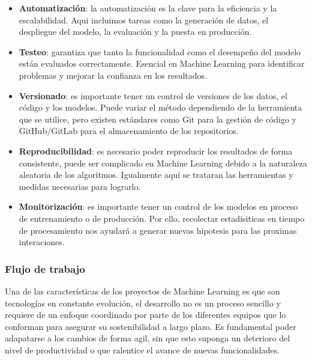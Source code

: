 \begin{itemize}
    \item \textbf{Automatización}: la automatización es la clave para la eficiencia y la escalabilidad.
          Aqui incluimos tareas como la generación de datos, el despliegue del modelo, la evaluación y
          la puesta en producción.
    \item \textbf{Testeo}: garantiza que tanto la funcionalidad como el desempeño del modelo están evaluados correctamente.
          Esencial en Machine Learning para identificar problemas y mejorar la confianza en los resultados.
    \item \textbf{Versionado}: es importante tener un control de versiones de los datos, el código y los modelos.
          Puede variar el método dependiendo de la herramienta que se utilice, pero existen estándares como Git para la gestión
          de código y GitHub/GitLab para el almacenamiento de los repositorios.
    \item \textbf{Reproducibilidad}: es necesario poder reproducir los resultados de forma consistente, puede ser
          complicado en Machine Learning debido a la naturaleza aleatoria de los algoritmos. Igualmente aquí se trataran
          las herramientas y medidas necesarias para lograrlo.
    \item \textbf{Monitorización}: es importante tener un control de los modelos en proceso de entrenamiento o de producción.
          Por ello, recolectar estadisiticas en tiempo de procesamiento nos ayudará a generar nuevas hipotesis para las proximas interaciones.
\end{itemize}

\subsubsection{Flujo de trabajo}
Una de las características de los proyectos de Machine Learning es que son tecnologías en constante evolución, el
desarrollo no es un proceso sencillo y requiere de un enfoque coordinado por parte de los diferentes
equipos que lo conforman para asegurar su sostenibilidad a largo plazo. Es fundamental poder adapatarse a los cambios
de forma agil, sin que esto suponga un deterioro del nivel de productividad o que ralentice el avance de nuevas
funcionalidades.\medskip

